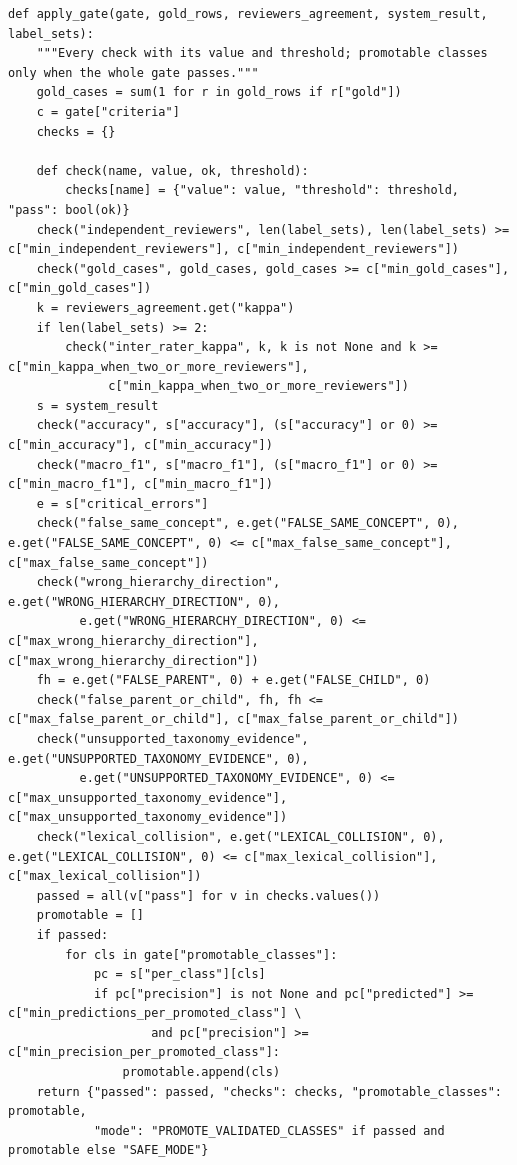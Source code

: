 \begin{lstlisting}[style=repo, firstnumber=257]
def apply_gate(gate, gold_rows, reviewers_agreement, system_result, label_sets):
    """Every check with its value and threshold; promotable classes only when the whole gate passes."""
    gold_cases = sum(1 for r in gold_rows if r["gold"])
    c = gate["criteria"]
    checks = {}

    def check(name, value, ok, threshold):
        checks[name] = {"value": value, "threshold": threshold, "pass": bool(ok)}
    check("independent_reviewers", len(label_sets), len(label_sets) >= c["min_independent_reviewers"], c["min_independent_reviewers"])
    check("gold_cases", gold_cases, gold_cases >= c["min_gold_cases"], c["min_gold_cases"])
    k = reviewers_agreement.get("kappa")
    if len(label_sets) >= 2:
        check("inter_rater_kappa", k, k is not None and k >= c["min_kappa_when_two_or_more_reviewers"],
              c["min_kappa_when_two_or_more_reviewers"])
    s = system_result
    check("accuracy", s["accuracy"], (s["accuracy"] or 0) >= c["min_accuracy"], c["min_accuracy"])
    check("macro_f1", s["macro_f1"], (s["macro_f1"] or 0) >= c["min_macro_f1"], c["min_macro_f1"])
    e = s["critical_errors"]
    check("false_same_concept", e.get("FALSE_SAME_CONCEPT", 0), e.get("FALSE_SAME_CONCEPT", 0) <= c["max_false_same_concept"], c["max_false_same_concept"])
    check("wrong_hierarchy_direction", e.get("WRONG_HIERARCHY_DIRECTION", 0),
          e.get("WRONG_HIERARCHY_DIRECTION", 0) <= c["max_wrong_hierarchy_direction"], c["max_wrong_hierarchy_direction"])
    fh = e.get("FALSE_PARENT", 0) + e.get("FALSE_CHILD", 0)
    check("false_parent_or_child", fh, fh <= c["max_false_parent_or_child"], c["max_false_parent_or_child"])
    check("unsupported_taxonomy_evidence", e.get("UNSUPPORTED_TAXONOMY_EVIDENCE", 0),
          e.get("UNSUPPORTED_TAXONOMY_EVIDENCE", 0) <= c["max_unsupported_taxonomy_evidence"], c["max_unsupported_taxonomy_evidence"])
    check("lexical_collision", e.get("LEXICAL_COLLISION", 0), e.get("LEXICAL_COLLISION", 0) <= c["max_lexical_collision"], c["max_lexical_collision"])
    passed = all(v["pass"] for v in checks.values())
    promotable = []
    if passed:
        for cls in gate["promotable_classes"]:
            pc = s["per_class"][cls]
            if pc["precision"] is not None and pc["predicted"] >= c["min_predictions_per_promoted_class"] \
                    and pc["precision"] >= c["min_precision_per_promoted_class"]:
                promotable.append(cls)
    return {"passed": passed, "checks": checks, "promotable_classes": promotable,
            "mode": "PROMOTE_VALIDATED_CLASSES" if passed and promotable else "SAFE_MODE"}
\end{lstlisting}

